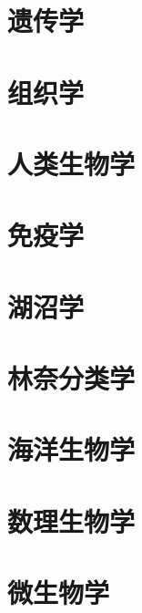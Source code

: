 \documentclass[UTF8]{NatureUniverse}
\begin{document}
\section{遗传学}
\section{组织学}
\section{人类生物学}
\section{免疫学}
\section{湖沼学}
\section{林奈分类学}
\section{海洋生物学}
\section{数理生物学}
\section{微生物学}
\end{document}
